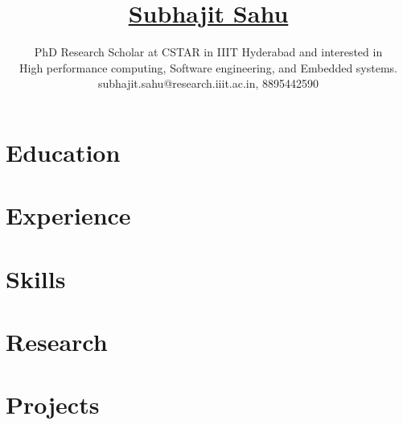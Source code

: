 \documentclass[11pt]{article}
\title{
  \vspace{-6ex}
  \href{https://wolfram77.github.io/}{Subhajit Sahu}
  \vspace{-4ex}
}
\author{
  PhD Research Scholar at CSTAR in IIIT Hyderabad and interested in \\
  High performance computing, Software engineering, and Embedded systems. \\
  {\small subhajit.sahu@research.iiit.ac.in, 8895442590} \\
}
\date{}
\begin{document}
\maketitle
\vspace{-9ex}

\section{Education}


\section{Experience}


\section{Skills}


\section{Research}


\section{Projects}



% 
% 
\end{document}
